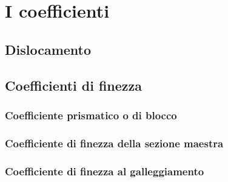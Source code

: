 \chapter{I coefficienti}
\section{Dislocamento}
\section{Coefficienti di finezza}
\subsection{Coefficiente prismatico o di blocco}
\subsection{Coefficiente di finezza della sezione maestra}
\subsection{Coefficiente di finezza al galleggiamento}